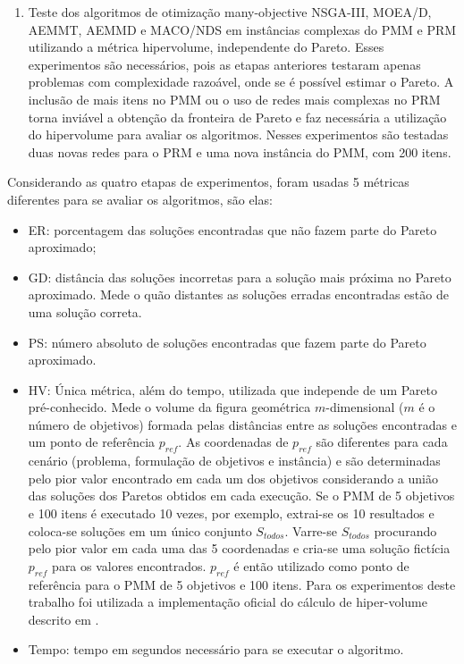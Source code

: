 \begin{enumerate}
	\item Teste dos algoritmos de otimização many-objective NSGA-III, MOEA/D, AEMMT, AEMMD e MACO/NDS em instâncias complexas do PMM e PRM utilizando a métrica hipervolume, independente do Pareto. Esses experimentos são necessários, pois as etapas anteriores testaram apenas problemas com complexidade razoável, onde se é possível estimar o Pareto. A inclusão de mais itens no PMM ou o uso de redes mais complexas no PRM torna inviável a obtenção da fronteira de Pareto e faz necessária a utilização do hipervolume para avaliar os algoritmos. Nesses experimentos são testadas duas novas redes para o PRM e uma nova instância do PMM, com 200 itens.
\end{enumerate}

Considerando as quatro etapas de experimentos, foram usadas 5 métricas diferentes para se avaliar os algoritmos, são elas:

\begin{itemize}
	\item \ac{ER}: porcentagem das soluções encontradas que não fazem parte do Pareto aproximado;
	\item \ac{GD}: distância das soluções incorretas para a solução mais próxima no Pareto aproximado. Mede o quão distantes as soluções erradas encontradas estão de uma solução correta.
	\item \ac{PS}: número absoluto de soluções encontradas que fazem parte do Pareto aproximado.
	\item \ac{HV}: Única métrica, além do tempo, utilizada que independe de um Pareto pré-conhecido. Mede o volume da figura geométrica $m$-dimensional ($m$ é o número de objetivos) formada pelas distâncias entre as soluções encontradas e um ponto de referência $p_{ref}$. As coordenadas de $p_{ref}$ são diferentes para cada cenário (problema, formulação de objetivos e instância) e são determinadas pelo pior valor encontrado em cada um dos objetivos considerando a união das soluções dos Paretos obtidos em cada execução. Se o PMM de 5 objetivos e 100 itens é executado 10 vezes, por exemplo, extrai-se os 10 resultados e coloca-se soluções em um único conjunto $S_{todos}$. Varre-se $S_{todos}$ procurando pelo pior valor em cada uma das 5 coordenadas e cria-se uma solução fictícia $p_{ref}$ para os valores encontrados. $p_{ref}$ é então utilizado como ponto de referência para o PMM de 5 objetivos e 100 itens. Para os experimentos deste trabalho foi utilizada a implementação oficial do cálculo de hiper-volume descrito em \cite{Bradstreet2012}.
	\item Tempo: tempo em segundos necessário para se executar o algoritmo.
\end{itemize}

